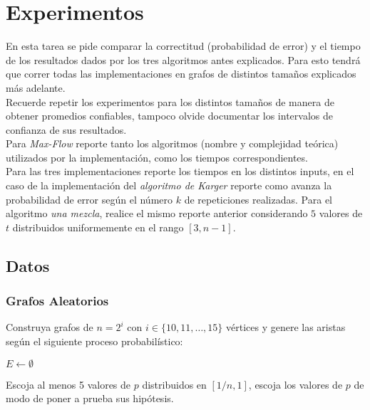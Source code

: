 \documentclass[dcc,uchile]{fcfmcourse}
\begin{document}
\section{Experimentos}
En esta tarea se pide comparar la correctitud  (probabilidad de error) y el tiempo de los resultados dados por los tres algoritmos antes explicados. Para esto tendrá que correr todas las implementaciones en grafos de distintos tamaños explicados más adelante.\\

Recuerde repetir los experimentos para los distintos tamaños de manera de obtener promedios confiables, tampoco olvide documentar los intervalos de confianza de sus resultados.\\

Para \textit{Max-Flow} reporte tanto los algoritmos (nombre y complejidad teórica) utilizados por la implementación, como los tiempos correspondientes.\\

Para las tres implementaciones reporte los tiempos en los distintos inputs, en el caso de la implementación del \textit{algoritmo de Karger} reporte como avanza la probabilidad de error según el número $k$ de repeticiones realizadas. Para el algoritmo \textit{una mezcla}, realice el mismo reporte anterior considerando $5$ valores de $t$ distribuidos uniformemente en el rango $[3,n-1]$.


\subsection*{Datos}

\subsubsection*{Grafos Aleatorios}
Construya grafos de $n = 2^i$ con $i \in \{10, 11, \ldots, 15\}$ vértices y genere las aristas según el siguiente proceso probabilístico:\\

\begin{algorithm}[H]

\SetAlgoLined
{}
 $E\gets \emptyset$\;

 
\end{algorithm}
Escoja al menos 5 valores de $p$ distribuidos en $[1/n,  1]$, escoja los valores de $p$ de modo de poner a prueba sus hipótesis.
\end{document}
